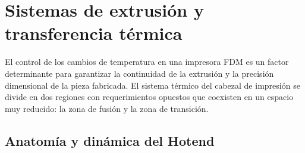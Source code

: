 \section{Sistemas de extrusión y transferencia térmica}

El control de los cambios de temperatura en una impresora FDM es un factor determinante para garantizar la continuidad de la extrusión y la precisión dimensional de la pieza fabricada. El sistema térmico del cabezal de impresión se divide en dos regiones con requerimientos opuestos que coexisten en un espacio muy reducido: la zona de fusión y la zona de transición.

\subsection{Anatomía y dinámica del Hotend}

